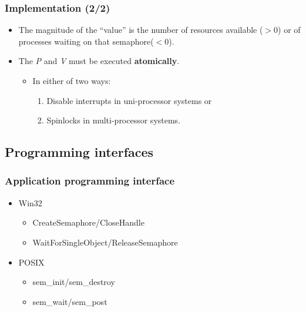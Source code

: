 \documentclass[CJKutf8,xcolor=pdftex,dvipsnames,table]{beamer}
\begin{document}
\begin{CJK*}{UTF8}{song}
\begin{frame}[fragile]
\end{frame}

  \begin{frame}
  \frametitle{Implementation (2/2)} \pause
    \begin{itemize}
    \item{The magnitude of the ``value'' is the number of resources available ($>$0) or of processes waiting on that semaphore($<$0).} \pause
    \item{The \emph{P} and \emph{V} must be executed \textbf{atomically}.} \pause
      \begin{itemize}
      \item{In either of two ways:} \pause
        \begin{enumerate}
        \item{Disable interrupts in uni-processor systems or} \pause
        \item{Spinlocks in multi-processor systems.}
        \end{enumerate}
      \end{itemize}
    \end{itemize}
  \end{frame}

\subsection{Programming interfaces}

  \begin{frame}
  \frametitle{Application programming interface} \pause
  \begin{itemize}
  \item{Win32} \pause
    \begin{itemize}
    \item{CreateSemaphore/CloseHandle} \pause
    \item{WaitForSingleObject/ReleaseSemaphore} \pause
    \end{itemize}
  \item{POSIX} \pause
    \begin{itemize}
    \item{sem\_init/sem\_destroy} \pause
    \item{sem\_wait/sem\_post}
    \end{itemize}
  \end{itemize}
  \end{frame}


\end{CJK*}
\end{document}
